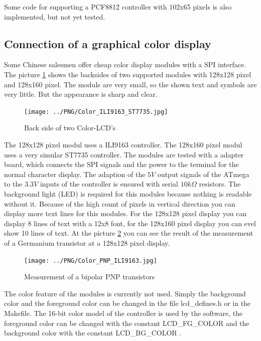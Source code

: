 Some code for supporting a PCF8812 controller with 102x65 pixels is also implemented,
but not yet tested.

\subsection{Connection of a graphical color display}

Some Chinese salesmen offer cheap color display modules with a SPI interface.
The picture \ref{fig:Color_both} shows the backsides of two supported modules with 128x128 pixel
and 128x160 pixel. 
The moduls are very small, so the shown text and symbols are very little.
But the appearance is sharp and clear.

\begin{figure}[H]
\centering
\texttt{[image: ../PNG/Color\_ILI9163\_ST7735.jpg]}
\caption{Back side of two Color-LCD's}
\label{fig:Color_both}
\end{figure}

The 128x128 pixel modul uses a ILI9163 controller.
The 128x160 pixel modul uses a very simular ST7735 controller.
The modules are tested with a adapter board, which connects the
SPI signals and the power to the terminal for the normal character display.
The adaption of the \(5V\) output signals of the ATmega to the \(3.3V\) inputs of the controller
is ensured with serial \(10k\Omega\) resistors.
The background light (LED) is required for this modules because nothing is readable without it.
Because of the high count of pixels in vertical direction you can display more text lines for this modules.
For the 128x128 pixel display you can display 8 lines of text with a 12x8 font,
for the 128x160 pixel display you can evel show 10 lines of text.
At the picture \ref{fig:Color_PNP} you can see the result of the measurement of a Germanium transistor
at a 128x128 pixel display.

\begin{figure}[H]
\centering
\texttt{[image: ../PNG/Color\_PNP\_ILI9163.jpg]}
\caption{Measurement of a bipolar PNP transistors}
\label{fig:Color_PNP}
\end{figure}

The color feature of the modules is currently not used.
Simply the background color and the foreground color can be changed in the file lcd\_defines.h or
in the Makefile.
The 16-bit color model of the controller is used by the software, the foreground color can be changed
with the constant LCD\_FG\_COLOR and the background color with the constant LCD\_BG\_COLOR .


